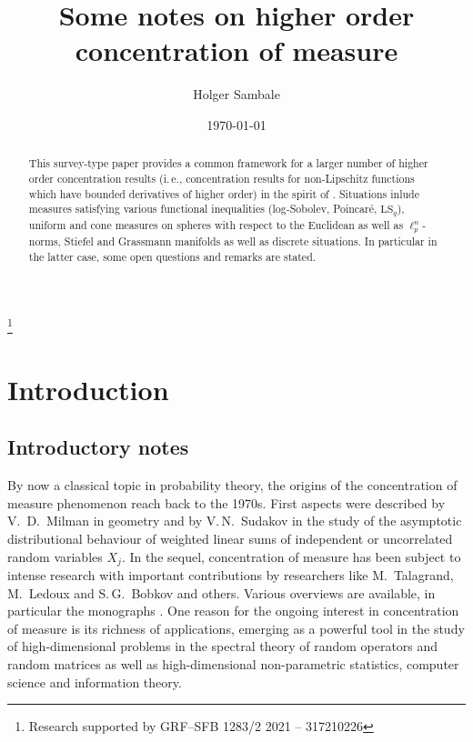 \documentclass[a4paper,12pt]{amsart}
\title[Higher order concentration]{Some notes on higher order concentration of measure}
\author{Holger Sambale}
\numberwithin{equation}{section}
\theoremstyle{remark}
\begin{document}
\begin{abstract}
	This survey-type paper provides a common framework for a larger number of higher order concentration results (i.\,e., concentration results for non-Lipschitz functions which have bounded derivatives of higher order) in the spirit of \cite{BGS19}. Situations inlude measures satisfying various functional inequalities (log-Sobolev, Poincar\'{e}, $\mathrm{LS}_q$), uniform and cone measures on spheres with respect to the Euclidean as well as $\ell_p^n$-norms, Stiefel and Grassmann manifolds as well as discrete situations. In particular in the latter case, some open questions and remarks are stated.
\end{abstract}

\thanks{Research  supported by GRF--SFB 1283/2 2021 -- 317210226}

\date{\today}

\maketitle

\section{Introduction}

\subsection{Introductory notes}
By now a classical topic in probability theory, the origins of the concentration of measure phenomenon reach back to the 1970s. First aspects were described by V.\ D.\ Milman \cite{Mil71} in geometry and by V.\,N.\ Sudakov \cite{Sud78} in the study of the asymptotic distributional behaviour of weighted linear sums of independent or uncorrelated random variables $X_j$. In the sequel, concentration of measure has been subject to intense research with important contributions by researchers like M.\ Talagrand, M.\ Ledoux and S.\,G.\ Bobkov and others. Various overviews are available, in particular the monographs \cite{MS86,Led01,BLM13,RS14,vHa16}. One reason for the ongoing interest in concentration of measure is its richness of applications, emerging as a powerful tool in the study of high-dimensional problems in the spectral theory of random operators and random matrices as well as high-dimensional non-parametric statistics, computer science and information theory.
\end{document}
